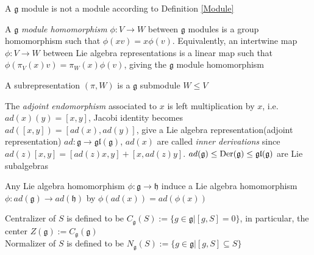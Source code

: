 \documentclass[main]{subfiles}
\begin{document}
\begin{remark}
A $\mathfrak g$ module is not a module according to Definition \ref{Module}
\end{remark}

\begin{definition}
A $\mathfrak g$ \textit{module homomorphism} $\phi:V\to W$ between $\mathfrak g$ modules is a group homomorphism such that $\phi(xv)=x\phi(v)$. Equivalently, an intertwine map $\phi:V\to W$ between Lie algebra representations is a linear map such that $\phi(\pi_V(x)v)=\pi_W(x)\phi(v)$, giving the $\mathfrak g$ module homomorphism \par
A subrepresentation $(\pi,W)$ is a $\mathfrak g$ submodule $W\leq V$
\end{definition}

\begin{definition}\label{Adjoint representation}
The \textit{adjoint endomorphism} associated to $x$ is left multiplication by $x$, i.e. $ad(x)(y)=[x,y]$, Jacobi identity becomes $ad([x,y])=[ad(x),ad(y)]$, give a Lie algebra representation(adjoint representation) $ad:\mathfrak{g}\to\mathfrak{gl}(\mathfrak{g})$, $ad(x)$ are called \textit{inner derivations} since $ad(z)[x,y]=[ad(z)x,y]+[x,ad(z)y]$. $ad(\mathfrak g)\leq \operatorname{Der}(\mathfrak g)\leq\mathfrak{gl}(\mathfrak{g})$ are Lie subalgebras \par
Any Lie algebra homomorphism $\phi:\mathfrak{g}\to\mathfrak{h}$ induce a Lie algebra homomorphism $\phi:ad(\mathfrak{g})\to ad(\mathfrak{h})$ by $\phi(ad(x))=ad(\phi(x))$
\begin{center}
\end{center}
\end{definition}

\begin{definition}
Centralizer of $S$ is defined to be $C_\mathfrak{g}(S):=\{g\in\mathfrak{g}|[g,S]=0\}$, in particular, the center $Z(\mathfrak{g}):=C_{\mathfrak{g}}(\mathfrak{g})$ \\
Normalizer of $S$ is defined to be $N_\mathfrak{g}(S):=\{g\in\mathfrak{g}|[g,S]\subseteq S\}$ \\
\end{definition}
\end{document}
